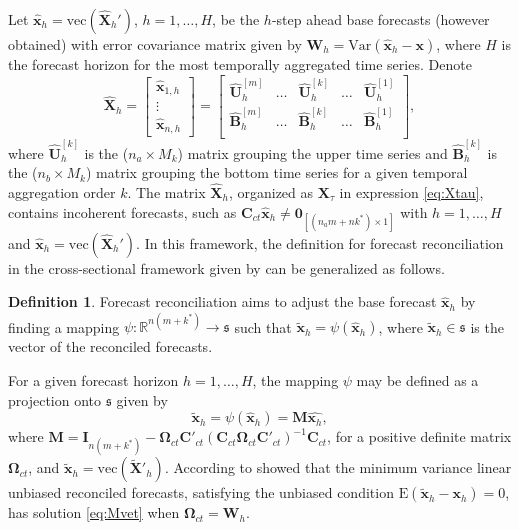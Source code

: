 \documentclass[12pt]{article}
\newcommand{\xvet}{\bm{x}}
\newcommand{\Bvet}{\bm{B}}
\newcommand{\Cvet}{\bm{C}}
\newcommand{\Ivet}{\bm{I}}
\newcommand{\Mvet}{\bm{M}}
\newcommand{\Uvet}{\bm{U}}
\newcommand{\Wvet}{\bm{W}}
\newcommand{\Xvet}{\bm{X}}
\newcommand{\Zerovet}{\bm{0}}
\newcommand{\Omegavet}{\bm{\Omega}}
\theoremstyle{definition}
\newtheorem{definition}{Definition}[section]
\begin{document}
Let $\widehat{\xvet}_{h} = \mathrm{vec}(\widehat{\Xvet}_{h}')$, $h = 1, \dots, H$, be the $h$-step ahead base forecasts (however obtained) with error covariance matrix given by $\bm{W}_h = \text{Var}(\widehat{\xvet}_h - \xvet)$, where $H$ is the forecast horizon for the most temporally aggregated time series. Denote
$$
	\widehat{\Xvet}_{h} = \begin{bmatrix}
		\widehat{\xvet}_{1,h} \\
		\vdots                \\
		\widehat{\xvet}_{n,h}
	\end{bmatrix} =\begin{bmatrix}
		\widehat{\Uvet}_{h}^{[m]} & \dots & \widehat{\Uvet}_{h}^{[k]} & \dots & \widehat{\Uvet}_{h}^{[1]} \\[0.25cm]
		\widehat{\Bvet}_{h}^{[m]} & \dots & \widehat{\Bvet}_{h}^{[k]} & \dots & \widehat{\Bvet}_{h}^{[1]} \\\end{bmatrix},
$$
where $\widehat{\Uvet}_{h}^{[k]}$ is the ($n_a\times M_k$) matrix grouping the upper time series and $\widehat{\Bvet}_{h}^{[k]}$ is the ($n_b\times M_k$) matrix grouping the bottom time series for a given temporal aggregation order $k$. The matrix $\widehat{\Xvet}_{h}$, organized as ${\Xvet}_{\tau}$ in expression \eqref{eq:Xtau}, contains incoherent forecasts, such as $\Cvet_{ct} \widehat{\xvet}_{h} \neq \Zerovet_{[(n_am+nk^\ast)\times1]}$
with $h = 1, \dots, H$ and $\widehat{\xvet}_{h} = \mathrm{vec}(\widehat{\Xvet}_{h}')$. In this framework, the definition for forecast reconciliation in the cross-sectional framework given by \cite{panagiotelis2021} can be generalized as follows.
\begin{definition}
	Forecast reconciliation aims to adjust the base forecast $\widehat{\xvet}_{h}$ by finding a mapping $\psi: \mathbb{R}^{n(m+k^\ast)} \rightarrow \mathfrak{s}$ such that $\widetilde{\xvet}_{h} = \psi\left(\widehat{\xvet}_{h}\right)$, where $\widetilde{\xvet}_{h} \in \mathfrak{s}$ is the vector of the reconciled forecasts.
\end{definition}

For a given forecast horizon $h = 1,\dots, H$, the mapping $\psi$ may be defined as a projection onto $\mathfrak{s}$ given by \citep{panagiotelis2021, difonzo2023}
\begin{equation}
	\label{eq:Mvet}
	\widetilde{\xvet}_{h} = \psi\left(\widehat{\xvet}_h\right) = \Mvet \widehat{\xvet_h},
\end{equation}
where $\Mvet = \Ivet_{n(m+ k^\ast)} - \Omegavet_{ct}\Cvet'_{ct}\left(\Cvet_{ct}\Omegavet_{ct}\Cvet'_{ct}\right)^{-1}\Cvet_{ct}$, for a positive definite matrix $\Omegavet_{ct}$, and $\widetilde{\xvet}_{h} = \mathrm{vec}(\widetilde{\Xvet}'_{h})$.
According to \citet{wickramasuriya2019} showed that the minimum variance linear unbiased reconciled forecasts, satisfying the unbiased condition $\text{E}(\widetilde{\xvet}_h -\bm{\xvet}_h) = 0$, has solution \eqref{eq:Mvet} when $\Omegavet_{ct} = \Wvet_h$.
\end{document}
